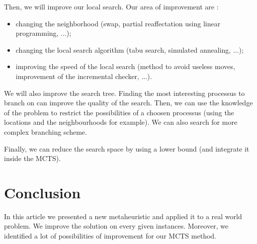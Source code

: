 \documentclass[a4paper,twocolumn]{article}
\begin{document}
Then, we will improve our local search.  Our area of improvement are :
\begin{itemize}
\item changing the neighborhood (swap, partial reaffectation using
  linear programming, ...);
\item changing the local search algorithm (tabu search, simulated
  annealing, ...);
\item improving the speed of the local search (method to avoid useless
  moves, improvement of the incremental checker, ...).
\end{itemize}

We will also improve the search tree.  Finding the most interesting
processus to branch on can improve the quality of the search.  Then, we
can use the knowledge of the problem to restrict the possibilities of
a choosen processus (using the locations and the neighbourhoods for
example).  We can also search for more complex branching scheme.

Finally, we can reduce the search space by using a lower bound (and
integrate it inside the MCTS).

\section{Conclusion}

In this article we presented a new metaheuristic and applied it to a
real world problem.  We improve the solution on every given
instances.  Moreover, we identified a lot of possibilities of
improvement for our MCTS method.



\end{document}
